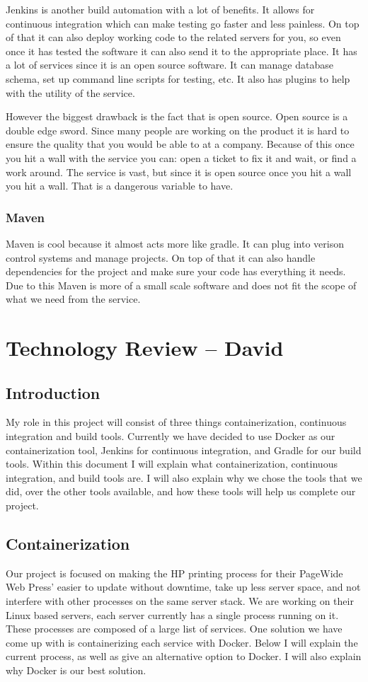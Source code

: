 \documentclass[onecolumn, draftclsnofoot,10pt, compsoc]{IEEEtran}
\begin{document}
Jenkins is another build automation with a lot of benefits. It allows for continuous integration which can make testing go faster and less painless. On top of that it can also deploy working code to the related servers for you, so even once it has tested the software it can also send it to the appropriate place. It has a lot of services since it is an open source software. It can manage database schema, set up command line scripts for testing, etc. It also has plugins to help with the utility of the service.

However the biggest drawback is the fact that is open source. Open source is a double edge sword. Since many people are working on the product it is hard to ensure the quality that you would be able to at a company. Because of this once you hit a wall with the service you can: open a ticket to fix it and wait, or find a work around. The service is vast, but since it is open source once you hit a wall you hit a wall. That is a dangerous variable to have.

\subsubsection{Maven}

Maven is cool because it almost acts more like gradle. It can plug into verison control systems and manage projects. On top of that it can also handle dependencies for the project and make sure your code has everything it needs. Due to this Maven is more of a small scale software and does not fit the scope of what we need from the service.

\section{Technology Review -- David}
\subsection {Introduction}
    My role in this project will consist of three things containerization, continuous integration and build tools. Currently we have decided to use Docker as our containerization tool, Jenkins for continuous integration, and Gradle for our build tools. Within this document I will explain what containerization, continuous integration, and build tools are. I will also explain why we chose the tools that we did, over the other tools available, and how these tools will help us complete our project.
\subsection{Containerization}
    Our project is focused on making the HP printing process for their PageWide Web Press' easier to update without downtime, take up less server space, and not interfere with other processes on the same server stack. We are working on their Linux based servers, each server currently has a single process running on it. These processes are composed of a large list of services. One solution we have come up with is containerizing each service with Docker. Below I will explain the current process, as well as give an alternative option to Docker. I will also explain why Docker is our best solution.
\end{document}
